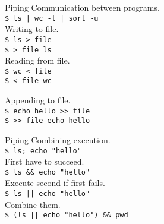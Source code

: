 \documentclass{beamer}
\let\tt\texttt
\begin{document}
\begin{frame}{Piping}
        Communication between programs.     \\
        \tt{\$ ls | wc -l | sort -u}        \\

        Writing to file.    \\
        \tt{\$ ls > file}   \\
        \tt{\$ > file ls}   \\

        Reading from file.    \\
        \tt{\$ wc < file}   \\
        \tt{\$ < file wc}
        
        Appending to file.    \\
        \tt{\$ echo hello >> file}   \\
        \tt{\$ >> file echo hello }
\end{frame}

\begin{frame}{Piping}
        Combining execution.     \\
        \tt{\$ ls; echo "hello"}        \\

        First have to succeed.    \\
        \tt{\$ ls \&\& echo "hello"}        \\

        Execute second if first fails.    \\
        \tt{\$ ls || echo "hello"}        \\

        Combine them.    \\
        \tt{\$ (ls || echo "hello") \&\& pwd}        \\
\end{frame}
\end{document}

